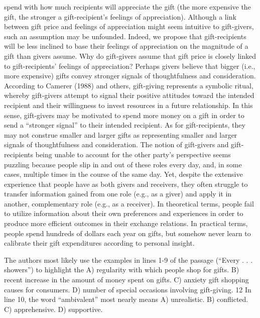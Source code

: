 spend with how much recipients will appreciate the
gift (the more expensive the gift, the stronger a
gift-recipient’s feelings of appreciation). Although a
link between gift price and feelings of appreciation
might seem intuitive to gift-givers, such an
assumption may be unfounded. Indeed, we propose
that gift-recipients will be less inclined to base their
feelings of appreciation on the magnitude of a gift
than givers assume.
Why do gift-givers assume that gift price is closely
linked to gift-recipients’ feelings of appreciation?
Perhaps givers believe that bigger (i.e., more
expensive) gifts convey stronger signals of
thoughtfulness and consideration. According to
Camerer (1988) and others, gift-giving represents a
symbolic ritual, whereby gift-givers attempt to signal
their positive attitudes toward the intended recipient
and their willingness to invest resources in a future
relationship. In this sense, gift-givers may be
motivated to spend more money on a gift in order to
send a “stronger signal” to their intended recipient.
As for gift-recipients, they may not construe smaller
and larger gifts as representing smaller and larger
signals of thoughtfulness and consideration.
The notion of gift-givers and gift-recipients being
unable to account for the other party’s perspective
seems puzzling because people slip in and out of
these roles every day, and, in some cases, multiple
times in the course of the same day. Yet, despite the
extensive experience that people have as both givers
and receivers, they often struggle to transfer
information gained from one role (e.g., as a giver)
and apply it in another, complementary role (e.g., as
a receiver). In theoretical terms, people fail to utilize
information about their own preferences and
experiences in order to produce more efficient
outcomes in their exchange relations. In practical
terms, people spend hundreds of dollars each year on
gifts, but somehow never learn to calibrate their gift
expenditures according to personal insight.




The authors most likely use the examples in lines 1-9
of the passage (“Every . . . showers”) to highlight the
A) regularity with which people shop for gifts.
B) recent increase in the amount of money spent on
gifts.
C) anxiety gift shopping causes for consumers.
D) number of special occasions involving
gift-giving.
12
In line 10, the word “ambivalent” most nearly means
A) unrealistic.
B) conflicted.
C) apprehensive.
D) supportive.



